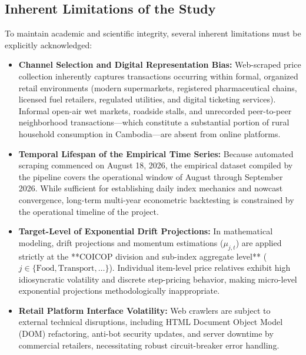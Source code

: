 \subsection{Inherent Limitations of the Study}
\hs To maintain academic and scientific integrity, several inherent limitations must be explicitly acknowledged:
\begin{itemize}
    \item \textbf{Channel Selection and Digital Representation Bias:} Web-scraped price collection inherently captures transactions occurring within formal, organized retail environments (modern supermarkets, registered pharmaceutical chains, licensed fuel retailers, regulated utilities, and digital ticketing services). Informal open-air wet markets, roadside stalls, and unrecorded peer-to-peer neighborhood transactions---which constitute a substantial portion of rural household consumption in Cambodia---are absent from online platforms.
    \item \textbf{Temporal Lifespan of the Empirical Time Series:} Because automated scraping commenced on August 18, 2026, the empirical dataset compiled by the pipeline covers the operational window of August through September 2026. While sufficient for establishing daily index mechanics and nowcast convergence, long-term multi-year econometric backtesting is constrained by the operational timeline of the project.
    \item \textbf{Target-Level of Exponential Drift Projections:} In mathematical modeling, drift projections and momentum estimations ($\mu_{j,t}$) are applied strictly at the **COICOP division and sub-index aggregate level** ($j \in \{\text{Food}, \text{Transport}, \dots\}$). Individual item-level price relatives exhibit high idiosyncratic volatility and discrete step-pricing behavior, making micro-level exponential projections methodologically inappropriate.
    \item \textbf{Retail Platform Interface Volatility:} Web crawlers are subject to external technical disruptions, including HTML Document Object Model (DOM) refactoring, anti-bot security updates, and server downtime by commercial retailers, necessitating robust circuit-breaker error handling.
\end{itemize}

